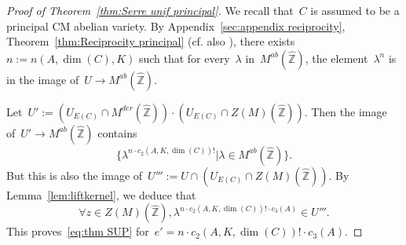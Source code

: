 \documentclass[12pt]{amsart}
\newtheorem{lemma}[theorem]{Lemma}
\newcommand{\Z}{{\mathbb Z}}
\newcommand{\Q}{{\mathbb Q}}
\newcommand{\ol}{\overline}
\newcommand{\wh}{\widehat}
\begin{document}
\begin{proof}[Proof of Theorem~\ref{thm:Serre unif principal}]
We recall that~$C$ is assumed to be a principal CM abelian variety. By Appendix~\ref{sec:appendix reciprocity}, Theorem~\ref{thm:Reciprocity principal} (cf. also \cite[Lem.\,2.7 and its proof]{UY}), there exists~$n:=n(A,\dim(C),K)$ such that for every~$\lambda$ in~$M^{ab}(\wh{\Z})$, the element~$\lambda^{n}$
is in the image of~$U\to M^{ab}(\wh{\Z})$.

Let~$U':=\left(U_{E(C)}\cap M^{der}(\widehat{\Z})\right)\cdot \left(U_{E(C)}\cap Z(M)(\widehat{\Z})\right)$.
Then the image of~$U'\to M^{ab}(\wh{\Z})$ contains
\[
\{\lambda^{n\cdot c_2(A,K,\dim(C))!}|\lambda\in M^{ab}(\wh{\Z})\}.
\]
But this is also the image of~$U''':=U\cap \left(U_{E(C)}\cap Z(M)(\widehat{\Z})\right)$. 
By Lemma~\ref{lem:liftkernel}, we deduce that
\[
\forall z\in Z(M)(\widehat{\Z}), \lambda^{n\cdot c_2(A,K,\dim(C))!\cdot c_3(A)}\in U'''.
\]
This proves~\eqref{eq:thm SUP} for~$e'=n\cdot c_2(A,K,\dim(C))!\cdot c_3(A)$.
\end{proof}


%
%
%
%
%
\end{document}

